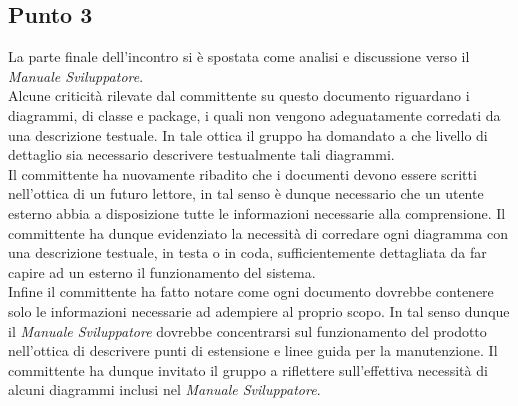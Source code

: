 \subsection{Punto 3}
La parte finale dell'incontro si è spostata come analisi e discussione verso il \textit{Manuale Sviluppatore}.\\
Alcune criticità rilevate dal committente su questo documento riguardano i diagrammi, di classe e package, i quali non vengono adeguatamente corredati da una descrizione testuale. In tale ottica il gruppo ha domandato a che livello di dettaglio sia necessario descrivere testualmente tali diagrammi.\\
Il committente ha nuovamente ribadito che i documenti devono essere scritti nell'ottica di un futuro lettore, in tal senso è dunque necessario che un utente esterno abbia a disposizione tutte le informazioni necessarie alla comprensione. Il committente ha dunque evidenziato la necessità di corredare ogni diagramma con una descrizione testuale, in testa o in coda, sufficientemente dettagliata da far capire ad un esterno il funzionamento del sistema.\\
Infine il committente ha fatto notare come ogni documento dovrebbe contenere solo le informazioni necessarie ad adempiere al proprio scopo. In tal senso dunque il \textit{Manuale Sviluppatore} dovrebbe concentrarsi sul funzionamento del prodotto nell'ottica di descrivere punti di estensione e linee guida per la manutenzione. Il committente ha dunque invitato il gruppo a riflettere sull'effettiva necessità di alcuni diagrammi inclusi nel \textit{Manuale Sviluppatore}.

